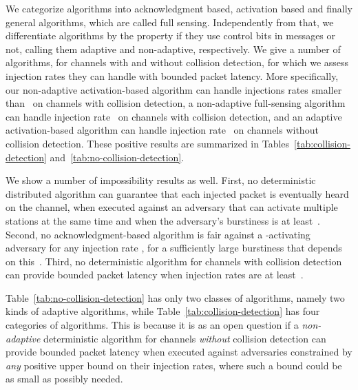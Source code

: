 \documentclass[11pt]{article}
\begin{document}
We categorize algorithms into acknowledgment based, activation based and finally general algorithms, which are called full sensing. 
Independently from that, we differentiate algorithms by the property if they use control bits in messages or not, calling them adaptive and non-adaptive,  respectively.
We give a number of algorithms, for channels with and without collision detection, for which we assess injection rates they can handle with bounded packet latency. 
More specifically, our non-adaptive  activation-based algorithm can handle injections rates smaller  than~ on channels with collision detection, a  non-adaptive  full-sensing algorithm can handle injection rate~ on  channels with collision detection, and an adaptive  activation-based algorithm can handle  injection rate~ on channels without collision detection.
These positive results are summarized in Tables~\ref{tab:collision-detection} and~\ref{tab:no-collision-detection}.

We show a number of impossibility results as well.
First, no deterministic distributed algorithm can guarantee that each injected packet is eventually heard on the channel, when executed against an adversary that can activate multiple stations at the same time and when the adversary's burstiness is at least~.
Second, no acknowledgment-based algorithm is fair against a -activating adversary for any injection rate , for a sufficiently large burstiness that depends on this~.
Third, no deterministic algorithm for channels with collision detection  can provide bounded packet latency when injection rates are at least~.

Table~\ref{tab:no-collision-detection} has only two classes of algorithms, namely two kinds of adaptive algorithms, while Table~\ref{tab:collision-detection} has four categories of algorithms.
This is because it is as an open question if a \emph{non-adaptive} deterministic algorithm for channels \emph{without} collision detection can provide bounded packet latency when executed against adversaries constrained by \emph{any} positive upper bound on their injection rates, where such a bound could  be  as small as possibly needed.
\end{document}
